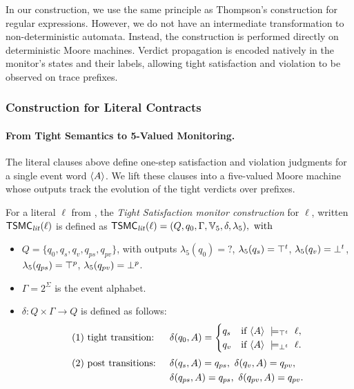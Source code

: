In our construction, we use the same principle as Thompson's construction for regular expressions. However, we do not have an intermediate transformation to non-deterministic automata. Instead, the construction is performed directly on deterministic Moore machines. Verdict propagation is encoded natively in the monitor's states and their labels, allowing tight satisfaction and violation to be observed on trace prefixes.
\subsubsection*{Construction for Literal Contracts}
\paragraph{From Tight Semantics to 5-Valued Monitoring.}
The literal clauses above define one-step satisfaction and violation judgments for a single event word $\langle A \rangle $.
We lift these clauses into a five-valued Moore machine whose outputs track the evolution of the tight verdicts over prefixes.
\begin{definition}
\label{def:moore-5-literal}
For a literal $\ell$ from \cDL, the \emph{Tight Satisfaction monitor construction} for $\ell$, written $\mathsf{TSMC}_{\mathit{lit}}(\ell)$ is defined as
$
\mathsf{TSMC}_{\mathit{lit}}(\ell)
  = (Q, q_0, \Gamma, \mathbb{V}_5 , \delta, \lambda_5), \text{ with }$

\begin{itemize}
  \item $Q=\{q_0,q_s,q_v,q_{ps},q_{pv}\}$,
        with outputs
        $\lambda_5(q_0)=\mathsf{?}$,
        $\lambda_5(q_s)=\top^t$,
        $\lambda_5(q_v)=\bot^t$,\\
        $\lambda_5(q_{ps})=\top^p$,
        $\lambda_5(q_{pv})=\bot^p$.
  \item $\Gamma=2^{\Sigma}$ is the event alphabet.
  \item $\delta:Q\times\Gamma\to Q$ is defined as follows:
\[
\begin{aligned}
&\text{(1) tight transition: } 
&& \delta(q_0,A)=
  \begin{cases}
    q_s & \text{if }\langle A \rangle \ \models_{\top^t}\ \ell,\\
    q_v & \text{if }\langle A \rangle \ \models_{\bot^t}\ \ell.
  \end{cases}\\[2pt]
&\text{(2) post transitions: }
&& \delta(q_s,A)=q_{ps},\ \delta(q_v,A)=q_{pv},\ \\ & &&
   \delta(q_{ps},A)=q_{ps},\ \delta(q_{pv},A)=q_{pv}.
\end{aligned}
\]

\end{itemize}
\end{definition}

